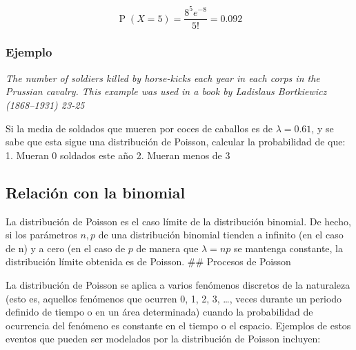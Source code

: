 \documentclass[]{book}
\theoremstyle{plain}
\theoremstyle{definition}
\theoremstyle{definition} %
\begin{document}
\[\displaystyle \operatorname {P} (X=5)={\frac {8^{5}e^{-8}}{5!}}=0.092\]

\hypertarget{ejemplo-8}{%
\subsubsection{Ejemplo}\label{ejemplo-8}}

\emph{The number of soldiers killed by horse-kicks each year in each
corps in the Prussian cavalry. This example was used in a book by
Ladislaus Bortkiewicz (1868--1931) 23-25}

Si la media de soldados que mueren por coces de caballos es de
\(\lambda = 0.61\), y se sabe que esta sigue una distribución de
Poisson, calcular la probabilidad de que: 1. Mueran 0 soldados este año
2. Mueran menos de 3

\hypertarget{relaciuxf3n-con-la-binomial}{%
\subsection{Relación con la
binomial}\label{relaciuxf3n-con-la-binomial}}

La distribución de Poisson es el caso límite de la distribución
binomial. De hecho, si los parámetros \(n, p\) de una distribución
binomial tienden a infinito (en el caso de n) y a cero (en el caso de
\(p\) de manera que \(\lambda = np\) se mantenga constante, la
distribución límite obtenida es de Poisson. \#\# Procesos de Poisson

La distribución de Poisson se aplica a varios fenómenos discretos de la
naturaleza (esto es, aquellos fenómenos que ocurren 0, 1, 2, 3,
\ldots{}, veces durante un periodo definido de tiempo o en un área
determinada) cuando la probabilidad de ocurrencia del fenómeno es
constante en el tiempo o el espacio. Ejemplos de estos eventos que
pueden ser modelados por la distribución de Poisson incluyen:
\end{document}
